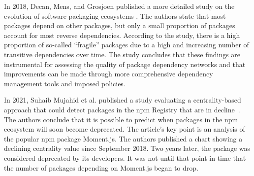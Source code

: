 
In 2018, Decan, Mens, and Grosjoen published a more detailed study on the evolution of software packaging ecosystems \cite{Decan2019}.
The authors state that most packages depend on other packages, but only a small proportion of packages account for most reverse dependencies.
According to the study, there is a high proportion of so-called “fragile” packages due to a high and increasing number of transitive dependencies over time.
The study concludes that these findings are instrumental for assessing the quality of package dependency networks and that improvements can be made through more comprehensive dependency management tools and imposed policies.


In 2021, Suhaib Mujahid et al. published a study evaluating a centrality-based approach that could detect packages in the npm Registry that are in decline~\cite{9631870}.
The authors conclude that it is possible to predict when packages in the npm ecosystem will soon become deprecated.
The article's key point is an analysis of the popular npm package Moment.js. The authors published a chart showing a declining centrality value since September 2018.
Two years later, the package was considered deprecated by its developers.
It was not until that point in time that the number of packages depending on Moment.js began to drop.


